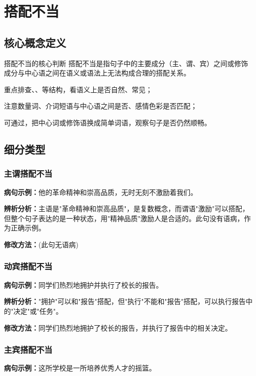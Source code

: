 \documentclass[a4paper,12pt]{ctexrep}
\newcommand{\exampleicon}{\textcolor{highlight}{\faExclamationTriangle}}
\newcommand{\analysisicon}{\textcolor{accent}{\faSearch}}
\newcommand{\revisionicon}{\textcolor{secondary}{\faCheckCircle}}
\begin{document}
\chapter{搭配不当}
\section{核心概念定义}
\begin{conceptbox}{搭配不当的核心判断}
搭配不当是指句子中的主要成分（主、谓、宾）之间或修饰成分与中心语之间在语义或语法上无法构成合理的搭配关系。
\begin{focuspoints}
  \item 重点排查、、等结构，看语义上是否自然、常见；
  \item 注意数量词、介词短语与中心语之间是否、感情色彩是否匹配；
  \item 可通过，把中心词或修饰语换成简单词语，观察句子是否仍然顺畅。
\end{focuspoints}
\end{conceptbox}

\section{细分类型}
\subsection{主谓搭配不当}
\exampleicon \textbf{病句示例：}他的革命精神和崇高品质，无时无刻不激励着我们。

\analysisicon \textbf{辨析分析：}主语是"革命精神和崇高品质"，是复数概念，而谓语"激励"可以搭配，但整个句子表达的是一种状态，用"精神品质"激励人是合适的。此句没有语病，作为正确示例。

\revisionicon \textbf{修改方法：}(此句无语病)

\subsection{动宾搭配不当}
\exampleicon \textbf{病句示例：}同学们热烈地拥护并执行了校长的报告。

\analysisicon \textbf{辨析分析：}"拥护"可以和"报告"搭配，但"执行"不能和"报告"搭配，可以执行报告中的"决定"或"任务"。

\revisionicon \textbf{修改方法：}同学们热烈地拥护了校长的报告，并执行了报告中的相关决定。

\subsection{主宾搭配不当}
\exampleicon \textbf{病句示例：}这所学校是一所培养优秀人才的摇篮。
\end{document}
